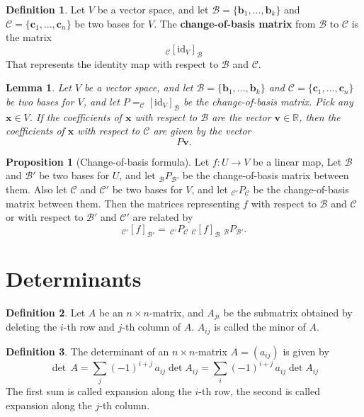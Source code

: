 \documentclass[11pt,a4paper]{article}
\newcommand\R{\mathbb{R}}
\newcommand\Bf{\mathcal{B}}
\newcommand\Cf{\mathcal{C}}
\newcommand\xb{\mathbf{x}}
\newcommand\bb{\mathbf{b}}
\newcommand\cb{\mathbf{c}}
\newcommand\vb{\mathbf{v}}
\newtheorem{lemma}{Lemma}
\theoremstyle{definition}
\newtheorem{definition}{Definition}
\newtheorem{proposition}{Proposition}
\begin{document}
\begin{definition}
    Let $ V $ be a vector space, and let $\Bf = \{\bb_1, ..., \bb_k\}$ and $\Cf = \{\cb_1, ..., \cb_n\}$ be two bases for $V$. 
    The \textbf{change-of-basis matrix} from $\Bf$ to $\Cf$ is the matrix
    \[_\Cf[\text{id}_V]_\Bf\]
    That represents the identity map with respect to $ \Bf $ and $ \Cf $.
\end{definition}

\begin{lemma}
    Let $ V $ be a vector space, and let $\Bf = \{\bb_1, ..., \bb_k\}$ and $\Cf = \{\cb_1, ..., \cb_n\}$ be two bases for $V$,
    and let $ P = _\Cf[\text{id}_V]_\Bf $ be the change-of-basis matrix. Pick any $ \xb \in V $. If the coefficients of $\xb$ with respect to $\Bf$ are the vector
    $\vb \in \R $, then the coefficients of $\xb$ with respect to $\Cf$ are given by the vector 
    \[P\vb.\]
\end{lemma}

\begin{proposition}[Change-of-basis formula]
   Let $ f : U \to V $ be a linear map, Let $ \Bf $ and $ \Bf'$ be two bases for $ U $, and let $ _\Bf P_{\Bf'} $ be the change-of-basis matrix between them. 
   Also let $ \Cf $ and $ \Cf'$ be two bases for $ V $, and let $ _{\Cf'}P_{\Cf} $ be the change-of-basis matrix between them. Then the matrices representing $ f $ with respect
   to $\Bf $ and $ \Cf $ or with respect to $ \Bf' $ and $ \Cf' $ are related by 
   \[ _{\Cf'} [f]_{\Bf'} = \, _{\Cf'}P_\Cf \; _\Cf [f]_\Bf \; _\Bf P_{\Bf'}.\]
\end{proposition}

\section{Determinants}

\begin{definition}
    Let $ A $ be an $ n\times n $-matrix, and $ A_{ji} $ be the submatrix obtained by deleting the $i$-th row and $j$-th column of $ A $. $A_{ij}$ is called the minor of $ A $.
\end{definition}

\begin{definition}
    The determinant of an $ n\times n $-matrix $ A = (a_{ij}) $ is given by 
    \[ \det \, A = \sum_j (-1)^{i + j} \, a_{ij} \det A_{ij} = \sum_i (-1)^{i + j} \, a_{ij} \det A_{ij} \]
    The first sum is called expansion along the $i$-th row, the second is called expansion along the $j$-th column. 
\end{definition}
\end{document}
